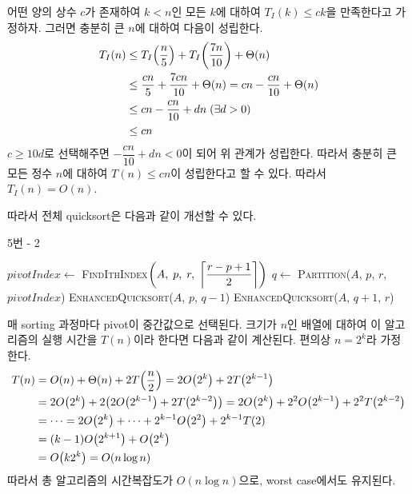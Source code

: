 \documentclass[10pt]{article}
\begin{document}
어떤 양의 상수 $c$가 존재하여 $k < n$인 모든 $k$에 대하여 $T_I(k) \leq ck$을 만족한다고 가정하자. 그러면 충분히 큰 $n$에 대하여 다음이 성립한다.
\begin{align*}
    T_I(n) &\leq T_I\qty(\frac{n}{5}) + T_I\qty(\frac{7n}{10}) + \Theta(n) \\
    &\leq \frac{cn}{5} + \frac{7cn}{10} + \Theta(n) = cn - \frac{cn}{10} + \Theta(n) \\
    &\leq cn - \frac{cn}{10} + dn \; (\exists d > 0) \\
    &\leq cn
\end{align*}
$c \geq 10d$로 선택해주면 $-\dfrac{cn}{10} + dn < 0$이 되어 위 관계가 성립한다. 따라서 충분히 큰 모든 정수 $n$에 대하여 $T(n) \leq cn$이 성립한다고 할 수 있다. 따라서 $T_I(n) = O(n)$.

\vspace{3mm}
따라서 전체 quicksort은 다음과 같이 개선할 수 있다.
\begin{algorithm}[H]
\caption{5번 - 2}\label{quicksort}
\begin{algorithmic}
     
            \State $pivotIndex \gets$ \textsc{FindIthIndex}$\qty(A, \;p, \;r, \;\left\lceil\dfrac{r-p+1}{2}\right\rceil)$
            \State $q \gets$ \textsc{Partition}($A$, $p$, $r$, $pivotIndex$)
            \State \textsc{EnhancedQuicksort}($A$, $p$, $q-1$)
            \State \textsc{EnhancedQuicksort}($A$, $q+1$, $r$)
        \EndIf
    \EndProcedure
\end{algorithmic}
\end{algorithm}
매 sorting 과정마다 pivot이 중간값으로 선택된다. 
크기가 $n$인 배열에 대하여 이 알고리즘의 실행 시간을 $T(n)$이라 한다면 다음과 같이 계산된다.
편의상 $n=2^k$라 가정한다.
\begin{align*}
    T(n) &= O(n) + \Theta(n) + 2T\qty(\frac{n}{2}) = 2O\qty(2^k) + 2T\qty(2^{k-1})\\
    &= 2O\qty(2^k) + 2\qty(2O\qty(2^{k-1}) + 2T\qty(2^{k-2})) = 2O\qty(2^k) + 2^2O\qty(2^{k-1}) + 2^2T\qty(2^{k-2}) \\
    &= \cdots = 2O\qty(2^k) + \cdots + 2^{k-1}O\qty(2^2) + 2^{k-1}T(2) \\
    &= (k-1)O\qty(2^{k+1}) + O\qty(2^k) \\
    &= O\qty(k2^k) = O(n\log{n})
\end{align*}
따라서 총 알고리즘의 시간복잡도가 $O(n\log{n})$으로, worst case에서도 유지된다.
\end{document}
